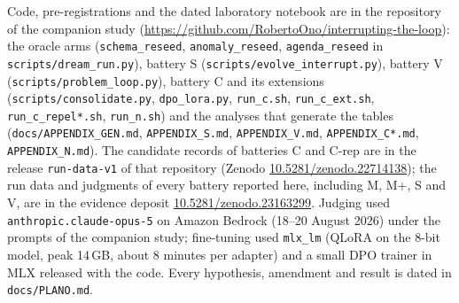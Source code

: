 \documentclass[11pt]{article}
\newcommand{\evidencedoi}{10.5281/zenodo.23163299}
\newcommand{\doilink}[1]{\href{https://doi.org/#1}{#1}}
\begin{document}
\begin{sloppypar}
Code, pre-registrations and the dated laboratory notebook are in the
repository of the companion study
(\url{https://github.com/RobertoOno/interrupting-the-loop}): the oracle arms
(\texttt{schema\_reseed}, \texttt{anomaly\_reseed}, \texttt{agenda\_reseed}
in \texttt{scripts/dream\_run.py}), battery S
(\texttt{scripts/evolve\_interrupt.py}), battery V
(\texttt{scripts/problem\_loop.py}), battery C and its extensions
(\texttt{scripts/consolidate.py}, \texttt{dpo\_lora.py},
\texttt{run\_c.sh}, \texttt{run\_c\_ext.sh}, \texttt{run\_c\_repel*.sh},
\texttt{run\_n.sh}) and the analyses that generate the tables
(\texttt{docs/APPENDIX\_GEN.md}, \texttt{APPENDIX\_S.md},
\texttt{APPENDIX\_V.md}, \texttt{APPENDIX\_C*.md}, \texttt{APPENDIX\_N.md}).
The candidate records of batteries C and C-rep are in the release
\texttt{run-data-v1} of that repository (Zenodo
\doilink{10.5281/zenodo.22714138}); the run data and judgments of every
battery reported here, including M, M+, S and V, are in the evidence
deposit \doilink{\evidencedoi}.
Judging used \texttt{anthropic.claude-opus-5} on Amazon Bedrock (18--20
August 2026) under the prompts of the companion study; fine-tuning used
\texttt{mlx\_lm} (QLoRA on the 8-bit model, peak 14\,GB, about 8 minutes
per adapter) and a small DPO trainer in MLX released with the code. Every
hypothesis, amendment and result is dated in \texttt{docs/PLANO.md}.
\end{sloppypar}



\end{document}
